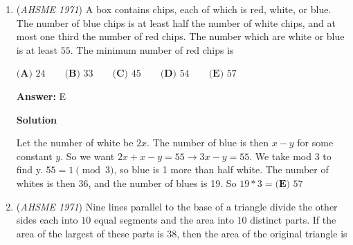 \begin{enumerate}
 



\textbf{Solution 2}

By \href{https://artofproblemsolving.com/wiki/index.php?title=Menelaus\%27\_Theorem}{Menelaus' Theorem} on $\triangle AGF$ and line $\overleftrightarrow{BC}$, we know that $\frac{AE}{GE} \cdot \frac{GB}{FB} \cdot \frac{FC}{AC}=1$. Because $G$ is the midpoint of $\overline{FB}$, we know that $\frac{GB}{FB}=\frac12$. Furthermore, from the problem, we know $\frac{FC}{AC}=\frac23$, so, by susbtitution,  our first equation becomes $\frac{AE}{GE} \cdot \frac12 \cdot \frac23 = 1$, so $\frac{AE}{GE}=3$, and therefore $\frac{AE}{AG}=\frac32$.

 Using Menelaus again on $\triangle BEG$ and line $\overleftrightarrow{AC}$ reveals that $\frac{BC}{EC} \cdot \frac{EA}{GA} \cdot \frac{GF}{BF}=1$. We know that $\frac{EA}{GA}=\frac{AE}{AG}=\frac32$ and $\frac{GF}{BF}=\frac12$. Thus, our equation becomes $\frac{BC}{EC} \cdot \frac32 \cdot \frac12=1$, and so  $\frac{BC}{EC}=\frac43$. Because $\frac{BC}{EC}=\frac{BE+EC}{EC}=1+\frac{BE}{EC}$, we see that $\frac{BE}{EC}=\frac13$, so our answer is $\boxed{\textbf{(B) }1:3}$.

 


	\item (\textit{AHSME 1971}) A box contains chips, each of which is red, white, or blue. The number of blue chips is at least half the number of white chips, 
and at most one third the number of red chips. The number which are white or blue is at least $55$. The minimum number of red chips is


 $\textbf{(A) }24\qquad \textbf{(B) }33\qquad \textbf{(C) }45\qquad \textbf{(D) }54\qquad  \textbf{(E) }57$

 \textbf{Answer: }E



\textbf{Solution}

Let the number of white be $2x$. The number of blue is then $x-y$ for some constant $y$. So we want $2x+x-y=55\rightarrow 3x-y=55$. We take mod 3 to find y. $55=1\pmod{3}$, so blue is 1 more than half white. The number of whites is then 36, and the number of blues is 19. So $19*3=\boxed{\textbf{(E) }57}$



	\item (\textit{AHSME 1971}) Nine lines parallel to the base of a triangle divide the other sides each into $10$ equal segments and the area into $10$ distinct parts. 
If the area of the largest of these parts is $38$, then the area of the original triangle is 



\end{enumerate}
